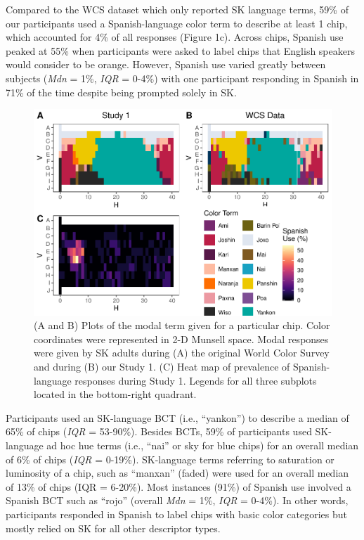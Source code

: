 \documentclass[
  english,
  ,man,floatsintext]{apa6}
\begin{document}
Compared to the WCS dataset which only reported SK language terms, 59\% of our participants used a Spanish-language color term to describe at least 1 chip, which accounted for 4\% of all responses (Figure 1c). Across chips, Spanish use peaked at 55\% when participants were asked to label chips that English speakers would consider to be orange. However, Spanish use varied greatly between subjects (\emph{Mdn} = 1\%, \emph{IQR} = 0-4\%) with one participant responding in Spanish in 71\% of the time despite being prompted solely in SK.

\begin{figure}
\centering
\includegraphics{amazon_color_files/figure-latex/study1-figure-1.pdf}
\caption{\label{fig:study1-figure}(A and B) Plots of the modal term given for a particular chip. Color coordinates were represented in 2-D Munsell space. Modal responses were given by SK adults during (A) the original World Color Survey and during (B) our Study 1. (C) Heat map of prevalence of Spanish-language responses during Study 1. Legends for all three subplots located in the bottom-right quadrant.}
\end{figure}

Participants used an SK-language BCT (i.e., \enquote{yankon}) to describe a median of 65\% of chips (\emph{IQR} = 53-90\%). Besides BCTs, 59\% of participants used SK-language ad hoc hue terms (i.e., \enquote{nai} or sky for blue chips) for an overall median of 6\% of chips (\emph{IQR} = 0-19\%). SK-language terms referring to saturation or luminosity of a chip, such as \enquote{manxan} (faded) were used for an overall median of 13\% of chips (IQR = 6-20\%). Most instances (91\%) of Spanish use involved a Spanish BCT such as \enquote{rojo} (overall \emph{Mdn} = 1\%, \emph{IQR} = 0-4\%). In other words, participants responded in Spanish to label chips with basic color categories but mostly relied on SK for all other descriptor types.
\end{document}

